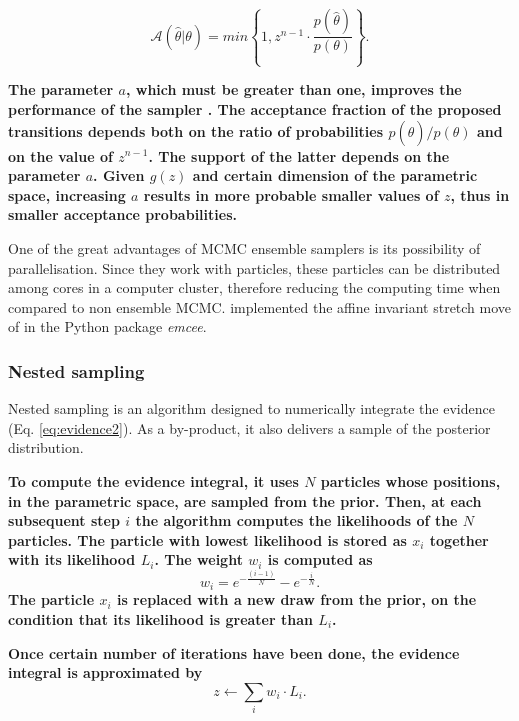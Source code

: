 \begin{equation}
\mathcal{A}(\hat{\theta}|\theta)=min\left\{1,z^{n-1}\cdot \frac{p(\hat{\theta})}{p(\theta)}\right\}.
\end{equation} 

\textbf{The parameter $a$, which must be greater than one, improves the performance of the sampler \citep{Goodman2010}. The acceptance fraction of the proposed transitions depends both on the ratio of probabilities $p(\hat{\theta})/p(\theta)$ and on the value of $z^{n-1}$. The support of the latter depends on the parameter $a$. Given $g(z)$ and certain dimension of the parametric space, increasing $a$ results in more probable smaller values of $z$, thus in smaller acceptance probabilities.}

One of the great advantages of MCMC ensemble samplers  is its possibility of parallelisation. Since they work with particles, these particles can be distributed among cores in a computer cluster, therefore reducing the computing time when compared to non ensemble MCMC. \citet{Foreman2013} implemented the affine invariant stretch move of \citet{Goodman2010} in the Python package \emph{emcee}. 
\subsubsection{Nested sampling}
\label{sect:NestedSampling}
Nested sampling \citep{Skilling2004,Skilling2006} is an algorithm designed to numerically integrate the evidence (Eq. \ref{eq:evidence2}). As a by-product, it also delivers a sample of the posterior distribution. 

\textbf{To compute the evidence integral, it uses $N$ particles whose positions, in the parametric space, are sampled from the prior. Then, at each subsequent step $i$ the algorithm computes the likelihoods of the $N$ particles. The particle with lowest likelihood is stored as $x_i$ together with its likelihood $L_{i}$. The weight $w_i$ is computed as}
\begin{equation}
w_i = e^{-\frac{(i-1)}{N}} - e^{-\frac{i}{N}}. \nonumber 
\end{equation}
\textbf{The particle $x_i$ is replaced with a new draw from the prior, on the condition that its likelihood is greater than $L_i$. }

\textbf{Once certain number of iterations have been done, the evidence integral is approximated by 
}\begin{equation}
z \leftarrow \sum_i w_i\cdot L_i.
\end{equation}

